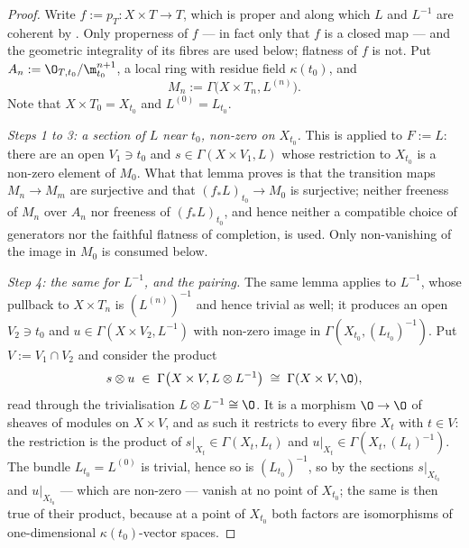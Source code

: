 \begin{proof}
Write $f:=p_T\colon X\times T\to T$, which is proper and along which $L$ and
$L^{-1}$ are coherent by .  Only
properness of $f$ --- in fact only that $f$ is a closed map --- and the
geometric integrality of its fibres are used below; flatness of $f$ is not.
Put $A_n:=\O_{T,t_0}/\m_{t_0}^{n+1}$, a local ring with residue field
$\kappa(t_0)$, and
\[
  M_n:=\Gamma\bigl(X\times T_n,L^{(n)}\bigr).
\]
Note that $X\times T_0=X_{t_0}$ and $L^{(0)}=L_{t_0}$.

\emph{Steps 1 to 3: a section of $L$ near $t_0$, non-zero on $X_{t_0}$.}  This
is  applied to $F:=L$: there are an
open $V_1\ni t_0$ and $s\in\Gamma(X\times V_1,L)$ whose restriction to
$X_{t_0}$ is a non-zero element of $M_0$.  What that lemma proves is that the
transition maps $M_n\to M_m$ are surjective and that $(f_*L)_{t_0}\to M_0$ is
surjective; neither freeness of $M_n$ over $A_n$ nor freeness of
$(f_*L)_{t_0}$, and hence neither a compatible choice of generators nor the
faithful flatness of completion, is used.  Only non-vanishing of the image in
$M_0$ is consumed below.

\emph{Step 4: the same for $L^{-1}$, and the pairing.}  The same lemma applies
to $L^{-1}$, whose pullback to $X\times T_n$ is $(L^{(n)})^{-1}$ and hence
trivial as well; it produces an open $V_2\ni t_0$ and
$u\in\Gamma(X\times V_2,L^{-1})$ with non-zero image in
$\Gamma(X_{t_0},(L_{t_0})^{-1})$.  Put $V:=V_1\cap V_2$ and consider the
product
\[
  s\otimes u\;\in\;\Gamma\bigl(X\times V,L\otimes L^{-1}\bigr)
  \;\cong\;\Gamma(X\times V,\O),
\]
read through the trivialisation $L\otimes L^{-1}\cong\O$.  It is a morphism
$\O\to\O$ of sheaves of modules on $X\times V$, and as such it restricts to
every fibre $X_t$ with $t\in V$: the restriction is the product of
$s|_{X_t}\in\Gamma(X_t,L_t)$ and $u|_{X_t}\in\Gamma(X_t,(L_t)^{-1})$.  The
bundle $L_{t_0}=L^{(0)}$ is trivial, hence so is $(L_{t_0})^{-1}$, so by
 the sections $s|_{X_{t_0}}$ and
$u|_{X_{t_0}}$ --- which are non-zero --- vanish at no point of $X_{t_0}$; the
same is then true of their product, because at a point of $X_{t_0}$ both
factors are isomorphisms of one-dimensional $\kappa(t_0)$-vector spaces.


\end{proof}
